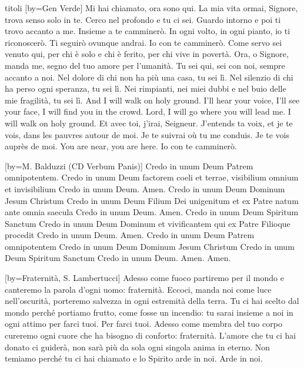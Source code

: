 \begin{songs}{titoli}
[by={Gen Verde}]
\beginverse
Mi hai chiamato, ora sono qui.
La mia vita ormai, Signore, trova senso solo in te.
Cerco nel profondo e tu ci sei.
Guardo intorno e poi ti trovo accanto a me.
\endverse
\beginchorus
Insieme a te camminerò.
In ogni volto, in ogni pianto, io ti riconoscerò.
Ti seguirò ovunque andrai.
Io con te camminerò.
\endchorus
\beginverse
Come servo sei venuto qui,
per chi è solo e chi è ferito, per chi vive in povertà.
Ora, o Signore, manda me,
segno del tuo amore per l'umanità.
\endverse
\beginverse*
Tu sei qui, sei con noi, sempre accanto a noi.
Nel dolore di chi non ha più una casa, tu sei lì.
Nel silenzio di chi ha perso ogni speranza, tu sei lì.
Nei rimpianti, nei miei dubbi
e nel buio delle mie fragilità, tu sei lì.
\endverse
\beginverse*
And I will walk on holy ground.
I'll hear your voice, I'll see your face, I will find you in the crowd.
Lord, I will go where you will lead me.
I will walk on holy ground.
\endverse
\beginverse*
Et avec toi, j'irai, Seigneur.
J'entends ta voix, et je te vois, dans les pauvres autour de moi.
Je te suivrai où tu me conduis.
Je te vois auprès de moi.
\endverse
\beginverse*
You are near, you are here.
Io con te camminerò.
\endverse
\endsong

[by={M. Balduzzi (CD Verbum Panis)}]
\beginverse
Credo in unum Deum Patrem omnipotentem.
Credo in unum Deum factorem coeli et terrae,
visibilium omnium et invisibilium
Credo in unum Deum. Amen.
\endverse
\beginverse
Credo in unum Deum Dominum Jesum Christum
Credo in unum Deum Filium Dei unigenitum
et ex Patre natum ante omnia saecula
Credo in unum Deum. Amen.
\endverse
\beginverse
Credo in unum Deum Spiritum Sanctum
Credo in unum Deum Dominum et vivificantem
qui ex Patre Filioque procedit
Credo in unum Deum. Amen.
\endverse
\beginverse
Credo in unum Deum Patrem omnipotentem
Credo in unum Deum Dominum Jesum Christum
Credo in unum Deum Spiritum Sanctum
Credo in unum Deum. Amen. Amen.
\endverse
\endsong

[by={Fraternità, S. Lambertucci}]
\beginverse
Adesso come fuoco partiremo per il mondo
e canteremo la parola d'ogni uomo:
fraternità.
Eccoci, manda noi come luce nell'oscurità,
porteremo salvezza in ogni estremità
della terra.
\endverse
\beginchorus
Tu ci hai scelto dal mondo perché portiamo frutto,
come fosse un incendio:
tu sarai insieme a noi in ogni attimo per farci tuoi. 
Per farci tuoi.
\endchorus
\beginverse
Adesso come membra del tuo corpo cureremo
ogni cuore che ha bisogno di conforto:
fraternità.
L'amore che tu ci hai donato ci guiderà,
non sarà più da sola ogni singola anima
in eterno.
\endverse
\beginverse*
Non temiamo perché tu ci hai chiamato
e lo Spirito arde in noi. 
Arde in noi.
\endverse
\endsong


\end{songs}
